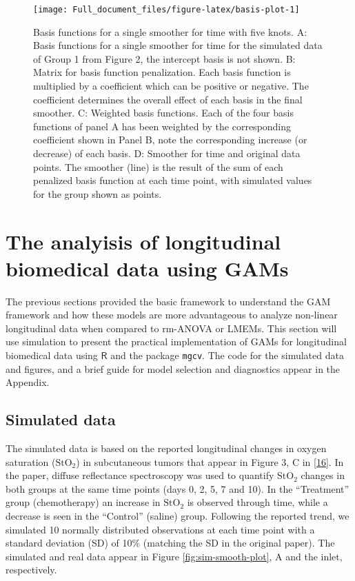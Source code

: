 \documentclass[
]{article}
\newcommand{\passthrough}[1]{#1}
\begin{document}
\begin{figure}[H]

{\centering \texttt{[image: Full\_document\_files/figure-latex/basis-plot-1]} 

}

\caption{Basis functions for a single smoother for time with five knots. A: Basis functions for a single smoother for time for the simulated data of Group 1 from Figure 2, the intercept basis is not shown. B: Matrix for basis function penalization. Each basis function is multiplied by a coefficient which can be positive or negative. The coefficient determines the overall effect of each basis in the final smoother. C: Weighted basis functions. Each of the four basis functions of panel A has been weighted by the corresponding coefficient shown in Panel B, note the corresponding increase (or decrease) of each basis. D: Smoother for time and original data points. The smoother (line) is the result of the sum of each penalized basis function at each time point, with simulated values for the group shown as points.}\label{fig:basis-plot}
\end{figure}

\FloatBarrier

\newpage

\hypertarget{longitudinal-GAMs}{%
\section{The analyisis of longitudinal biomedical data using GAMs}\label{longitudinal-GAMs}}

The previous sections provided the basic framework to understand the GAM framework and how these models are more advantageous to analyze non-linear longitudinal data when compared to rm-ANOVA or LMEMs. This section will use simulation to present the practical implementation of GAMs for longitudinal biomedical data using \(\textsf{R}\) and the package \passthrough{\lstinline!mgcv!}. The code for the simulated data and figures, and a brief guide for model selection and diagnostics appear in the Appendix.

\hypertarget{simulated-data}{%
\subsection{Simulated data}\label{simulated-data}}

The simulated data is based on the reported longitudinal changes in oxygen saturation (\(\mbox{StO}_2\)) in subcutaneous tumors that appear in Figure 3, C in {[}\protect\hyperlink{ref-vishwanath2009}{16}{]}. In the paper, diffuse reflectance spectroscopy was used to quantify \(\mbox{StO}_2\) changes in both groups at the same time points (days 0, 2, 5, 7 and 10). In the ``Treatment'' group (chemotherapy) an increase in \(\mbox{StO}_2\) is observed through time, while a decrease is seen in the ``Control'' (saline) group. Following the reported trend, we simulated 10 normally distributed observations at each time point with a standard deviation (SD) of 10\% (matching the SD in the original paper).
The simulated and real data appear in Figure \ref{fig:sim-smooth-plot}, A and the inlet, respectively.
\end{document}
